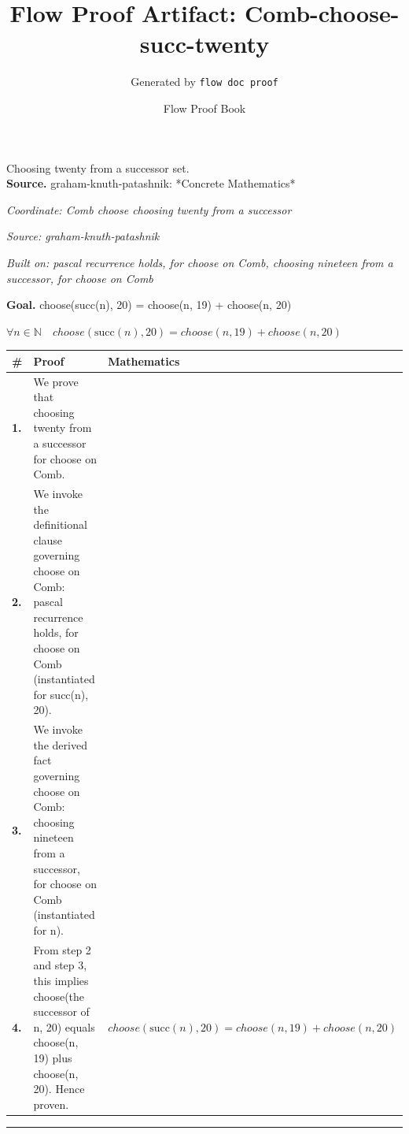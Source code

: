 \documentclass[11pt]{article}
\title{Flow Proof Artifact: Comb-choose-succ-twenty}
\author{Generated by \texttt{flow doc proof}}
\date{Flow Proof Book}
\theoremstyle{definition}
\begin{document}
\maketitle
Choosing twenty from a successor set.\\[0.5em]
\textbf{Source.} graham-knuth-patashnik: *Concrete Mathematics*\\[0.5em]
\bigskip
{}\par
\smallskip\noindent\textit{Coordinate: Comb \cdot choose \cdot choosing twenty from a successor}\par
\smallskip\noindent\textit{Source: graham-knuth-patashnik}\par
\smallskip\noindent\textit{Built on: pascal recurrence holds, for choose on Comb, choosing nineteen from a successor, for choose on Comb}\par
\medskip
\noindent\textbf{Goal.} choose(succ(n), 20) = choose(n, 19) + choose(n, 20)\par
\noindent$\displaystyle \forall n \in \mathbb{N}\quad choose(\mathrm{succ}(n), 20) = choose(n, 19) + choose(n, 20)$\par
\medskip
\noindent
\begin{tabular}{@{} >{\raggedright\arraybackslash}p{} >{\raggedright\arraybackslash}p{} >{\raggedleft\arraybackslash}p{} @{}}
\textbf{\#} & \textbf{Proof} & \textbf{Mathematics} \\
\midrule
\textbf{1.} & We prove that choosing twenty from a successor for choose on Comb. & \\[0.45em]
\textbf{2.} & We invoke the definitional clause governing choose on Comb: pascal recurrence holds, for choose on Comb (instantiated for succ(n), 20). & \\[0.45em]
\textbf{3.} & We invoke the derived fact governing choose on Comb: choosing nineteen from a successor, for choose on Comb (instantiated for n). & \\[0.45em]
\textbf{4.} & From step 2 and step 3, this implies choose(the successor of n, 20) equals choose(n, 19) plus choose(n, 20). Hence proven. & $\displaystyle choose(\mathrm{succ}(n), 20) = choose(n, 19) + choose(n, 20)$ \\[0.45em]
\bottomrule
\end{tabular}
\label{thm:Comb-choose-choosing_twenty_from_a_successor}
\par\medskip\hrule
\end{document}
